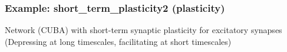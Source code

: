 \documentclass[letterpaper,10pt,english]{manual}
\begin{document}
\resetcurrentobjects
\hypertarget{--doc-examples-plasticity_short_term_plasticity2}{}

\hypertarget{index-79}{}\subsubsection{Example: short\_term\_plasticity2 (plasticity)}

Network (CUBA) with short-term synaptic plasticity for excitatory synapses
(Depressing at long timescales, facilitating at short timescales)
\end{document}
